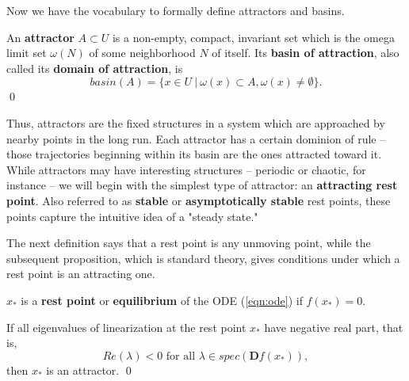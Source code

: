 Now we have the vocabulary to formally define attractors and basins.

\begin{definition}
	An \textbf{attractor} $A \subset U$ is a non-empty, compact, invariant set which is the omega limit set $\omega(N)$ of some neighborhood $N$ of itself. Its \textbf{basin of attraction}, also called its \textbf{domain of attraction}, is $$basin(A) = \{x \in U ~|~ \omega(x) \subset A, \omega(x) \neq \emptyset\}.$$ \qed
\end{definition}

Thus, attractors are the fixed structures in a system which are approached by nearby points in the long run. Each attractor has a certain dominion of rule -- those trajectories beginning within its basin are the ones attracted toward it. While attractors may have interesting structures -- periodic or chaotic, for instance -- we will begin with the simplest type of attractor: an \textbf{attracting rest point}. Also referred to as \textbf{stable} or \textbf{asymptotically stable} rest points, these points capture the intuitive idea of a "steady state." 


The next definition says that a rest point is any unmoving point, while the subsequent proposition, which is standard theory, gives conditions under which a rest point is an attracting one. 

\begin{definition}
	$x_\ast$ is a \textbf{rest point} or \textbf{equilibrium} of the ODE (\ref{eqn:ode}) if $f(x_\ast) = 0$.
\end{definition}


\begin{proposition}
	If all eigenvalues of linearization at the rest point $x_{\ast}$ have negative real part, that is, $$Re(\lambda) < 0 \text{ for all } \lambda \in spec(\textbf{D}f(x_\ast)),$$ 
then $x_{\ast}$ is an attractor. %
\qed
\end{proposition}


